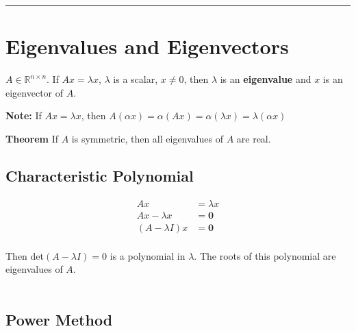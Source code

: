\documentclass[9pt]{article}
\begin{document}
\begin{multicols}{3}
\hrule

\vspace{-0.45cm}
\section{Eigenvalues and Eigenvectors}

$A \in \mathbb{R}^{n \times n}$. If $Ax = \lambda x$, $\lambda$ is a scalar, $x \neq 0$, then $\lambda$ is an \textbf{eigenvalue} and $x$ is an eigenvector of $A$.

\textbf{Note: } If $Ax = \lambda x$, then $A(\alpha x) = \alpha (Ax) = \alpha (\lambda x) = \lambda (\alpha x)$

\textbf{Theorem} If $A$ is symmetric, then all eigenvalues of $A$ are real.

\hdashrule{\linewidth}{0.5pt}{1mm 1mm}

\vspace{-0.5cm}
\subsection*{Characteristic Polynomial}
\[
\begin{aligned}
Ax &= \lambda x\\
Ax - \lambda x & =\mathbf{0}\\ 
(A - \lambda I) x & =\mathbf{0}\\ 
\end{aligned}
\]

Then det$(A - \lambda I) = 0$ is a polynomial in $\lambda$. The roots of this polynomial are eigenvalues of $A$.\\

\\

\hdashrule{\linewidth}{0.5pt}{1mm 1mm}

\vspace{-0.55cm}
\subsection*{Power Method}


\end{multicols}
\end{document}
